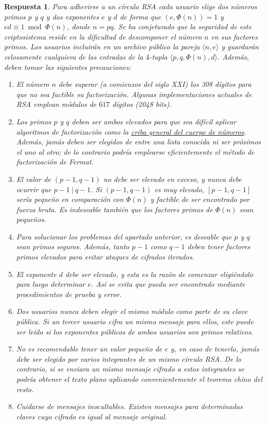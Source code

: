 \documentclass[
  a4paper,
  spanish,
  12pt,
]{scrartcl}
\theoremstyle{ejercicio-style}
\theoremstyle{remark-style}
\newtheorem*{sol}{Respuesta}
\theoremstyle{teorema-style}
\begin{document}
\begin{sol}
  Para adherirse a un círculo RSA cada usuario elige dos números primos $p$ y $q$ y dos exponentes $e$ y $d$ de forma que $(e, \Phi(n)) = 1$ y $ed \equiv 1 \bmod \Phi(n)$, donde $n=pq$. Se ha conjeturado que la seguridad de este criptosistema reside en la dificultad de descomponer el número $n$ en sus factores primos. Los usuarios incluirán en un archivo público la pareja $\langle n, e\rangle$ y guardarán celosamente cualquiera de las entradas de la $4$-tupla $\langle p, q, \Phi(n), d \rangle$. Además, deben tomar las siguientes precauciones:
  \begin{enumerate}
    \item El número $n$ debe superar (a comienzos del siglo XXI) los 308 dígitos para que no sea factible su factorización. Algunas implementaciones actuales de RSA emplean módulos de $617$ dígitos (2048 bits).
    \item Los primos $p$ y $q$ deben ser ambos elevados para que sea difícil aplicar algoritmos de factorización como la \href{https://en.wikipedia.org/wiki/General_number_field_sieve}{criba general del cuerpo de números}. Además, jamás deben ser elegidos de entre una lista conocida ni ser próximos el uno al otro; de lo contrario podría emplearse eficientemente el método de factorización de Fermat.
    \item El valor de $(p-1, q-1)$ no debe ser elevado en exceso, y nunca debe ocurrir que $p-1 \ | \ q-1$. Si $(p-1, q-1)$ es muy elevado, $[p-1, q-1]$ sería pequeño en comparación con $\Phi(n)$ y factible de ser encontrado por fuerza bruta. Es indeseable también que los factores primos de $\Phi(n)$ sean pequeños.
    \item Para solucionar los problemas del apartado anterior, es deseable que $p$ y $q$ sean \textit{primos seguros}. Además, tanto $p-1$ como $q-1$ deben tener factores primos elevados para evitar ataques de cifrados iterados.
    \item El exponente $d$ debe ser elevado, y esta es la razón de comenzar eligiéndolo para luego determinar $e$. Así se evita que pueda ser encontrado mediante procedimientos de prueba y error.
    \item Dos usuarios nunca deben elegir el mismo módulo como parte de su clave pública. Si un tercer usuario cifra un mismo mensaje para ellos, este puede ser leído si los exponentes públicos de ambos usuarios son primos relativos.
    \item No es recomendable tener un valor pequeño de $e$ y, en caso de tenerlo, jamás debe ser elegido por varios integrantes de un mismo círculo RSA. De lo contrario, si se enviara un mismo mensaje cifrado a estos integrantes se podría obtener el texto plano aplicando convenientemente el \textit{teorema chino del resto}.
    \item Cuidarse de mensajes inocultables. Existen mensajes para determinadas claves cuyo cifrado es igual al mensaje original.
  \end{enumerate}
\end{sol}
\end{document}
